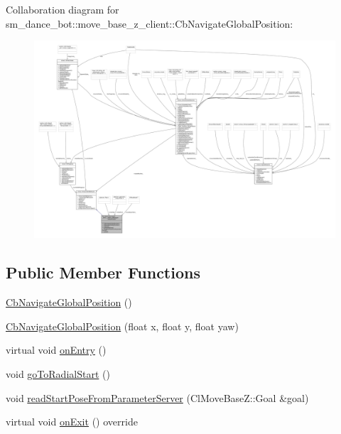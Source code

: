 Collaboration diagram for sm\+\_\+dance\+\_\+bot\+:\+:move\+\_\+base\+\_\+z\+\_\+client\+:\+:Cb\+Navigate\+Global\+Position\+:
\nopagebreak
\begin{figure}[H]
\begin{center}
\leavevmode
\includegraphics[width=350pt]{classsm__dance__bot_1_1move__base__z__client_1_1CbNavigateGlobalPosition__coll__graph}
\end{center}
\end{figure}
\subsection*{Public Member Functions}
\begin{DoxyCompactItemize}
\item 
\hyperlink{classsm__dance__bot_1_1move__base__z__client_1_1CbNavigateGlobalPosition_aa9346ec96bd44862a7e36fffff54bdb8}{Cb\+Navigate\+Global\+Position} ()
\item 
\hyperlink{classsm__dance__bot_1_1move__base__z__client_1_1CbNavigateGlobalPosition_aaa061279a6dbdf8ee5d5d02d5bab1098}{Cb\+Navigate\+Global\+Position} (float x, float y, float yaw)
\item 
virtual void \hyperlink{classsm__dance__bot_1_1move__base__z__client_1_1CbNavigateGlobalPosition_a8ad5cc3b238e6964043213f7dbead1dd}{on\+Entry} ()
\item 
void \hyperlink{classsm__dance__bot_1_1move__base__z__client_1_1CbNavigateGlobalPosition_aa7e91d17625df52b94bb29a9cd1ae7e5}{go\+To\+Radial\+Start} ()
\item 
void \hyperlink{classsm__dance__bot_1_1move__base__z__client_1_1CbNavigateGlobalPosition_ad936dff37e9ca4d5ba0fb602ada6671e}{read\+Start\+Pose\+From\+Parameter\+Server} (Cl\+Move\+Base\+Z\+::\+Goal \&goal)
\item 
virtual void \hyperlink{classsm__dance__bot_1_1move__base__z__client_1_1CbNavigateGlobalPosition_a5191a81c97253290c73e039dfda88aa9}{on\+Exit} () override
\end{DoxyCompactItemize}
